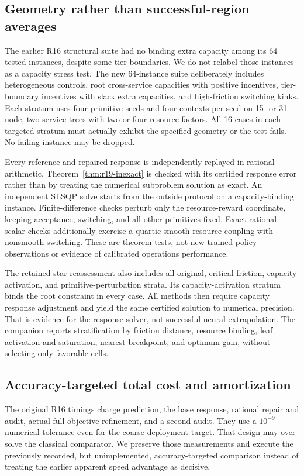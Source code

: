 \subsection{Geometry rather than successful-region averages}
The earlier R16 structural suite had no binding extra capacity among its 64 tested instances, despite some tier boundaries. We do not relabel those instances as a capacity stress test. The new 64-instance suite deliberately includes heterogeneous controls, root cross-service capacities with positive incentives, tier-boundary incentives with slack extra capacities, and high-friction switching kinks. Each stratum uses four primitive seeds and four contexts per seed on 15- or 31-node, two-service trees with two or four resource factors. All 16 cases in each targeted stratum must actually exhibit the specified geometry or the test fails. No failing instance may be dropped.

Every reference and repaired response is independently replayed in rational arithmetic. Theorem~\ref{thm:r19-inexact} is checked with its certified response error rather than by treating the numerical subproblem solution as exact. An independent SLSQP solve starts from the outside protocol on a capacity-binding instance. Finite-difference checks perturb only the resource-reward coordinate, keeping acceptance, switching, and all other primitives fixed. Exact rational scalar checks additionally exercise a quartic smooth resource coupling with nonsmooth switching. These are theorem tests, not new trained-policy observations or evidence of calibrated operations performance.

The retained star reassessment also includes all original, critical-friction, capacity-activation, and primitive-perturbation strata. Its capacity-activation stratum binds the root constraint in every case. All methods then require capacity response adjustment and yield the same certified solution to numerical precision. That is evidence for the response solver, not successful neural extrapolation. The companion reports stratification by friction distance, resource binding, leaf activation and saturation, nearest breakpoint, and optimum gain, without selecting only favorable cells.

\subsection{Accuracy-targeted total cost and amortization}
The original R16 timings charge prediction, the base response, rational repair and audit, actual full-objective refinement, and a second audit. They use a $10^{-9}$ numerical tolerance even for the coarse deployment target. That design may over-solve the classical comparator. We preserve those measurements and execute the previously recorded, but unimplemented, accuracy-targeted comparison instead of treating the earlier apparent speed advantage as decisive.


